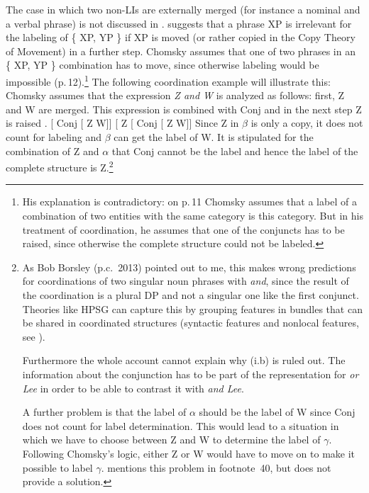 The case in which two non-LIs are externally merged (for instance a nominal
and a verbal phrase) is not discussed in . \citet[--44]{Chomsky2013a}
suggests that a phrase XP is irrelevant for the labeling of \{ XP, YP \} if XP is moved (or rather
copied in the Copy Theory of Movement) in a further step. Chomsky assumes that one of two phrases in
an \{ XP, YP \} combination has to move, since otherwise labeling would be impossible (p.\,12).\footnote{\label{fn-labeling-gleiche-Kategorie}%
  His explanation is contradictory: on p.\,11 Chomsky assumes that a label of a combination of
  two entities with the same category is this category. But in his treatment of coordination, he
  assumes that one of the conjuncts has to be raised, since otherwise the complete structure could not be labeled.
}
The following coordination example will illustrate this: Chomsky assumes that the expression \emph{Z
  and W} is analyzed as follows: first, Z and W are merged. This expression is combined with Conj
   and in the next step Z is raised . 
\eal
\label{Chomsky-problems-of-projection-coordination}
\ex\label{ex-coord-a} {}[\sub{$\alpha$} Conj [\sub{$\beta$} Z W]]
\ex\label{ex-coord-b} {}[\sub{$\gamma$} Z [\sub{$\alpha$} Conj [\sub{$\beta$} Z W]]
\zl
Since Z in $\beta$ is only a copy, it does not count for labeling and $\beta$ can get the label
of W. It is stipulated for the combination of Z and $\alpha$ that Conj cannot be the label and hence
the label of the complete structure is Z.\footnote{%
    As Bob Borsley (p.c.\ 2013) pointed out to me, this makes wrong predictions for coordinations of
    two singular noun phrases with \emph{and}, since the result of the coordination is a plural DP
    and not a singular one like the first conjunct. Theories like HPSG can capture this by grouping
    features in bundles that can be shared in coordinated structures (syntactic features and
    nonlocal features, see ).

Furthermore the whole account cannot explain why (i.b) is ruled out.
\eal
\zl
The information about the conjunction has to be part of the representation for \emph{or Lee} in
order to be able to contrast it with \emph{and Lee}. 

A further problem is that the label of $\alpha$ should be the label of W since Conj does not count
for label determination. This would lead to a situation in which we have to choose between Z and W
to determine the label of $\gamma$. Following Chomsky's logic, either Z or W would have to move on to
make it possible to label $\gamma$. \citet{Chomsky2013a} mentions this problem in footnote~40, but does not provide a solution.
}

